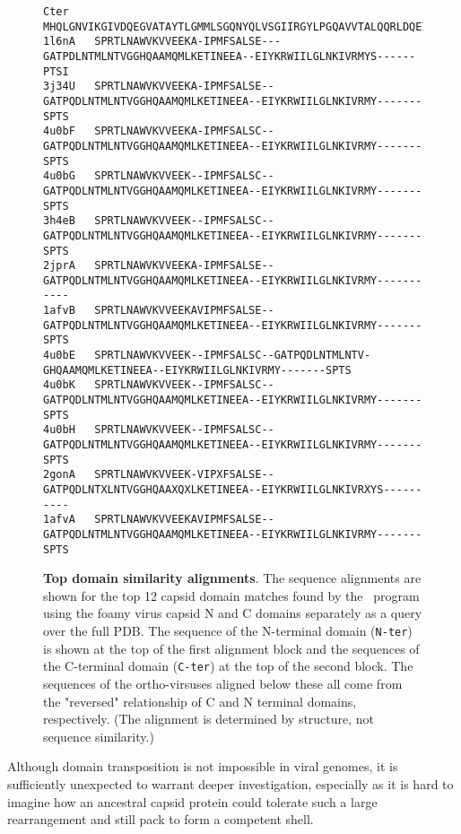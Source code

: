 \begin{figure}
\begin{singlespace}
\begin{tiny}
\begin{Verbatim}[frame=single]
Cter    MHQLGNVIKGIVDQEGVATAYTLGMMLSGQNYQLVSGIIRGYLPGQAVVTALQQRLDQEIDNQTRAETFIQHLNAVYEILGLNARGQSIRL
1l6nA   SPRTLNAWVKVVEEKA-IPMFSALSE---GATPDLNTMLNTVGGHQAAMQMLKETINEEA--EIYKRWIILGLNKIVRMYS------PTSI
3j34U   SPRTLNAWVKVVEEKA-IPMFSALSE--GATPQDLNTMLNTVGGHQAAMQMLKETINEEA--EIYKRWIILGLNKIVRMY-------SPTS
4u0bF   SPRTLNAWVKVVEEKA-IPMFSALSC--GATPQDLNTMLNTVGGHQAAMQMLKETINEEA--EIYKRWIILGLNKIVRMY-------SPTS
4u0bG   SPRTLNAWVKVVEEK--IPMFSALSC--GATPQDLNTMLNTVGGHQAAMQMLKETINEEA--EIYKRWIILGLNKIVRMY-------SPTS
3h4eB   SPRTLNAWVKVVEEK--IPMFSALSC--GATPQDLNTMLNTVGGHQAAMQMLKETINEEA--EIYKRWIILGLNKIVRMY-------SPTS
2jprA   SPRTLNAWVKVVEEKA-IPMFSALSE--GATPQDLNTMLNTVGGHQAAMQMLKETINEEA--EIYKRWIILGLNKIVRMY-----------
1afvB   SPRTLNAWVKVVEEKAVIPMFSALSE--GATPQDLNTMLNTVGGHQAAMQMLKETINEEA--EIYKRWIILGLNKIVRMY-------SPTS
4u0bE   SPRTLNAWVKVVEEK--IPMFSALSC--GATPQDLNTMLNTV-GHQAAMQMLKETINEEA--EIYKRWIILGLNKIVRMY-------SPTS
4u0bK   SPRTLNAWVKVVEEK--IPMFSALSC--GATPQDLNTMLNTVGGHQAAMQMLKETINEEA--EIYKRWIILGLNKIVRMY-------SPTS
4u0bH   SPRTLNAWVKVVEEK--IPMFSALSC--GATPQDLNTMLNTVGGHQAAMQMLKETINEEA--EIYKRWIILGLNKIVRMY-------SPTS
2gonA   SPRTLNAWVKVVEEK-VIPXFSALSE--GATPQDLNTXLNTVGGHQAAXQXLKETINEEA--EIYKRWIILGLNKIVRXYS----------
1afvA   SPRTLNAWVKVVEEKAVIPMFSALSE--GATPQDLNTMLNTVGGHQAAMQMLKETINEEA--EIYKRWIILGLNKIVRMY-------SPTS
\end{Verbatim}
\end{tiny}
\end{singlespace}
\begin{footnotesize}
\caption{
\label{Fig:swap}
{\bf Top domain similarity alignments}.
The sequence alignments are shown for the top 12 capsid domain matches found by the \DALI\ program 
using the foamy virus capsid N and C domains separately as a query over the full PDB.
The sequence of the N-terminal domain ({\tt N-ter}) is shown at the top of the first alignment block and the
sequences of the C-terminal domain ({\tt C-ter}) at the top of the second block.   The sequences of the
ortho-virsuses aligned below these all come from the "reversed" relationship of C and N terminal domains, respectively.
(The alignment is determined by structure, not sequence similarity.)
}
\end{footnotesize}
\end{figure}

Although domain transposition is not impossible in viral genomes,  it is sufficiently
unexpected to warrant deeper investigation, especially as it is hard to imagine how an ancestral
capsid protein could tolerate such a large rearrangement and still pack to form a competent shell.

